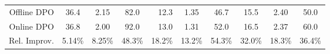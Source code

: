 \begin{table*}[t]
{\begin{tabular}{r|ccc|rcc|ccc}
        \cellcolor{orange!12} Offline DPO
        & \cellcolor{orange!12} 36.4 
        & \cellcolor{orange!12} 2.15 
        & \cellcolor{orange!12} 82.0 
        & \cellcolor{orange!12} 12.3
        & \cellcolor{orange!12} 1.35
        & \cellcolor{orange!12} 46.7
        & \cellcolor{orange!12} 15.5 
        & \cellcolor{orange!12} 2.40 
        & \cellcolor{orange!12} 50.0 \\
        \cellcolor{orange!12} Online DPO 
        & \cellcolor{orange!12} 36.8 
        & \cellcolor{orange!12} 2.00 
        & \cellcolor{orange!12} 92.0 
        & \cellcolor{orange!12} 13.0 
        & \cellcolor{orange!12} 1.31
        & \cellcolor{orange!12} 52.0 
        & \cellcolor{orange!12} 16.5
        & \cellcolor{orange!12} 2.37 
        & \cellcolor{orange!12} 60.0 \\
        \hline
        \cellcolor{red!16} Rel. Improv. 
        & \cellcolor{red!16} 5.14\% 
        & \cellcolor{red!16} 8.25\%
        & \cellcolor{red!16} 48.3\% 
        & \cellcolor{red!16} 18.2\%
        & \cellcolor{red!16} 13.2\%
        & \cellcolor{red!16} 54.3\%
        & \cellcolor{red!16} 32.0\% 
        & \cellcolor{red!16} 18.3\% 
        & \cellcolor{red!16} 36.4\% \\
    \hline
    \hline
    \end{tabular}
    }
    \label{tab:results}
    \vspace{-10pt}
\end{table*}

